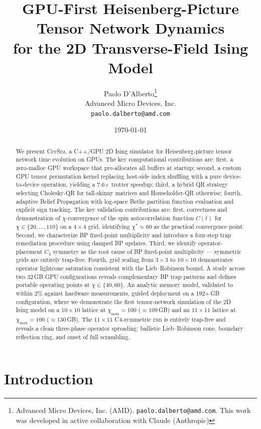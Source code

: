 \documentclass[11pt]{article}
\title{%
 \Large\bfseries GPU-First Heisenberg-Picture Tensor Network Dynamics\\
 for the 2D Transverse-Field Ising Model\\[0.5em]
}
\author{
 Paolo D'Alberto\thanks{Advanced Micro Devices, Inc. (AMD).
 \texttt{paolo.dalberto@amd.com}.
 This work was developed in active collaboration with Claude
 (Anthropic)}\\
 \small Advanced Micro Devices, Inc.\\
 \small\texttt{paolo.dalberto@amd.com}
}
\date{\today}
\newcommand{\chimax}{\chi_{\mathrm{max}}}
\begin{document}
\maketitle
\thispagestyle{fancy}

\begin{abstract}
We present \textsc{CppSim}, a C++/GPU 2D Ising simulator for
Heisenberg-picture tensor network time evolution on GPUs. The key
computational contributions are: first, a zero-malloc GPU workspace
that pre-allocates all buffers at startup; second, a custom GPU tensor
permutation kernel replacing host-side index shuffling with a pure
device-to-device operation, yielding a 7.6$\times$ trotter speedup;
third, a hybrid QR strategy selecting Cholesky-QR for tall-skinny
matrices and Householder-QR otherwise; fourth, adaptive Belief
Propagation with log-space Bethe partition function evaluation and
explicit sign tracking. The key validation contributions are: first,
correctness and demonstration of $\chi$-convergence of the spin
autocorrelation function $C(t)$ for $\chi \in \{20,\ldots,110\}$ on a
$4\times4$ grid, identifying $\chi^* \approx 60$ as the practical
convergence point. Second, we characterize BP fixed-point
multiplicity and introduce a four-step trap remediation procedure
using damped BP updates. Third, we identify operator-placement $C_4$
symmetry as the root cause of BP fixed-point multiplicity ---
symmetric grids are entirely trap-free. Fourth, grid scaling from
$3\times3$ to $10\times10$ demonstrates operator lightcone saturation
consistent with the Lieb--Robinson bound. A study across two 32\,GB GPU configurations reveals complementary BP
trap patterns and defines portable operating points at $\chi \in \{40, 60\}$.
An analytic memory model, validated to within 2\% against hardware
measurements, guided deployment on a 192+\,GB configuration, where we
demonstrate the first tensor-network simulation of the 2D Ising model on
a $10\times10$ lattice at $\chimax=100$ ($\approx109$\,GB) and an
$11\times11$ lattice at $\chimax=100$ ($\approx130$\,GB). The
$11\times11$ C4-symmetric run is entirely trap-free and reveals a clean
three-phase operator spreading: ballistic Lieb--Robinson cone, boundary
reflection ring, and onset of full scrambling.
\end{abstract}


\section{Introduction}
\label{sec:intro}
\end{document}
